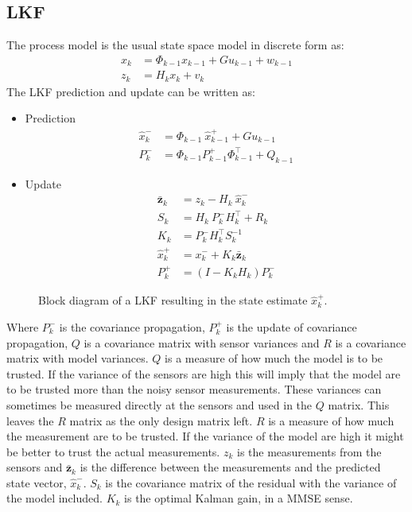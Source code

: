 \subsection{\acl{LKF}}
The process model is the usual state space model in discrete form as:
\begin{align}
x_k &= \Phi_{k-1} x_{k-1} + G u_{k-1} + w_{k-1}\\
z_k &= H_k x_k + v_k
\end{align}
\noindent The \ac{LKF} prediction and update can be written as:
\begin{itemize}\tightlist
\item Prediction
\begin{align}
\hat x_k^- &= \Phi_{k-1}\ \hat x_{k-1}^+ + G u_{k-1} \\
P_k^- &= \Phi_{k-1}P_{k-1}^+ \Phi_{k-1}^\top + Q_{k-1}
\end{align}
\item Update
\begin{align}
\bar{\mathbf{z}}_k &= z_k - H_k\ \hat x_k^-\\
S_k &= H_k\ P_k^-H_k^\top + R_k\\
K_k &= P_k^-H_k^\top S_k^{-1}\\
\hat x_k^+ &= x_k^- + K_k \bar{\mathbf{z}}_k\\
P_k^+ &= (I - K_k H_k) P_k^-
\end{align}
\end{itemize}

\begin{figure}
	\centering
	
	\caption{Block diagram of a \acl{LKF} resulting in the state estimate $\hat x_k^+$.}
	\label{fig:blockkf}
\end{figure}

Where $P_{k}^-$ is the covariance propagation, $P_{k}^+$ is the update of covariance propagation, $Q$ is a covariance matrix with sensor variances and $R$ is a covariance matrix with model variances. $Q$ is a measure of how much the model is to be trusted. If the variance of the sensors are high this will imply that the model are to be trusted more than the noisy sensor measurements. These variances can sometimes be measured directly at the sensors and used in the $Q$ matrix. This leaves the $R$ matrix as the only design matrix left. $R$ is a measure of how much the measurement are to be trusted. If the variance of the model are high it might be better to trust the actual measurements. $z_k$ is the measurements from the sensors and $\bar{\mathbf{z}}_k$ is the difference between the measurements and the predicted state vector, $\hat x_k^-$. $S_k$ is the covariance matrix of the residual with the variance of the model included. $K_k$ is the optimal Kalman gain, in a \ac{MMSE} sense. 

